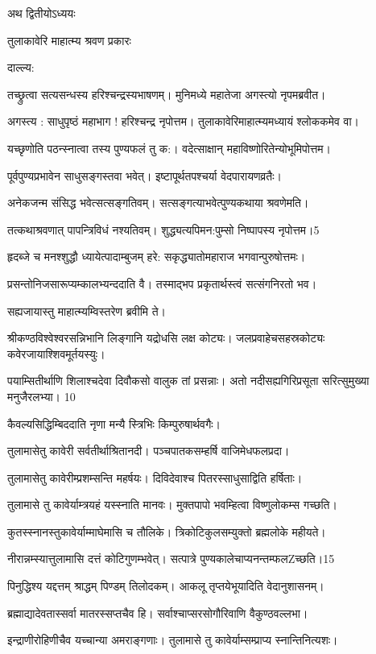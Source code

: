 अथ द्वितीयोऽध्ययः

तुलाकावेरि माहात्म्य श्रवण प्रकारः


दाल्ल्य:

तच्छ्रुत्वा सत्यसन्धस्य हरिश्चन्द्रस्यभाषणम्।
मुनिमध्ये महातेजा अगस्त्यो नृपमब्रवीत।

अगस्त्य : साधुपृष्ठं महाभाग ! हरिश्चन्द्र नृपोत्तम।
तुलाकावेरिमाहात्म्यमध्यायं श्लोककमेव वा।

यच्छृणोति पठन्स्नात्वा तस्य पुण्यफलं तु क:।
वदेत्साक्षान् महाविष्णोरितेन्योभूमिपोत्तम।

पूर्वपुण्यप्रभावेन साधुसङ्गस्तवा भवेत्।
इष्टापूर्थतपश्चर्या वेदपारायणव्रतैः।

अनेकजन्म संसिद्ध भवेत्सत्सङ्गतिवम्।
सत्सङ्गत्याभवेत्पुण्यकथाया श्रवणेमति।

तत्कथाश्रवणात् पापन्त्रिविधं नश्यतिवम्।
शुद्ध्यत्यपिमन:पुम्सो निष्पापस्य नृपोत्तम।5

हृदब्जे च मनश्शुद्धौ ध्यायेत्पादाम्बुजम् हरे:
सकृद्ध्यातोमहाराज भगवान्पुरुषोत्तमः।

प्रसन्तोनिजसारूप्यम्कालभ्यन्ददाति वै।
तस्माद्भप प्रकृतार्थस्त्वं सत्संगनिरतो भव।

सह्यजायास्तु माहात्म्यम्विस्तरेण ब्रवीमि ते।

श्रीकण्ठविश्वेश्वरसन्निभानि
लिङ्गानि यद्रोधसि लक्ष कोट्यः।
जलप्रवाहेचसहस्रकोट्यः
कवेरजायाश्शिवमूर्तयस्युः।

पयाम्सितीर्थाणि शिलाश्चदेवा
दिवौकसो वालुक तां प्रसन्नाः।
अतो नदीसह्यगिरिप्रसूता
सरित्सुमुख्या मनुजैरलभ्या। 10

कैवल्यसिद्धिम्बिददाति नृणा
मन्यै स्त्रिभिः किम्पुरुषार्थवगैः।

तुलामासेतु कावेरी सर्वतीर्थाश्रितानदी।
पञ्चपातकसम्हर्षि वाजिमेधफलप्रदा।

तुलामासेतु कावेरीम्प्रशम्सन्ति महर्षयः।
दिविदेवाश्च पितरस्साधुसाद्विति हर्षिताः।

तुलामासे तु कावेर्याम्त्रयहं यस्स्नाति मानवः।
मुक्तपापो भवम्हित्वा विष्णुलोकम्स गच्छति।

कुतस्स्नानस्तुकावेर्याम्माघेमासि च तौलिके।
त्रिकोटिकुलसम्युक्तो ब्रह्मलोके महीयते।

नीरान्नम्स्यात्तुलामासि दत्तं कोटिगुणम्भवेत्।
सत्पात्रे पुण्यकालेचाप्यनन्तम्फलZच्छति।15

पिनुद्धिश्य यद्दत्तम् श्राद्धम् पिण्डम् तिलोदकम्।
आकलू तृप्तयेभूयादिति वेदानुशासनम्।

ब्रह्माद्यादेवतास्सर्वा मातरस्सप्तचैव हि।
सर्वाश्चाप्सरसोगौरिवाणि वैकुण्ठवल्लभा।

इन्द्राणीरोहिणीचैव यच्चान्या अमराङ्गणाः।
तुलामासे तु कावेर्याम्सम्प्राप्य स्नान्तिनित्यशः।

